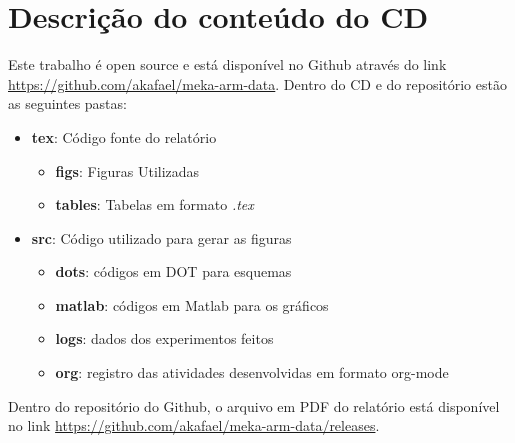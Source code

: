 \chapter{Descrição do conteúdo do CD}

\label{AnCD}

Este trabalho é open source e está disponível no Github através do link \url{https://github.com/akafael/meka-arm-data}. Dentro do CD e do repositório estão as seguintes pastas:

\begin{itemize}
    \item \textbf{tex}: Código fonte do relatório
    \begin{itemize}
        \item \textbf{figs}: Figuras Utilizadas
        \item \textbf{tables}: Tabelas em formato \textit{.tex}
    \end{itemize}
    \item \textbf{src}: Código utilizado para gerar as figuras
    \begin{itemize}
        \item \textbf{dots}: códigos em DOT para esquemas
        \item \textbf{matlab}: códigos em Matlab para os gráficos
        \item \textbf{logs}: dados dos experimentos feitos
        \item \textbf{org}: registro das atividades desenvolvidas em formato org-mode
        \end{itemize}
\end{itemize}

Dentro do repositório do Github, o arquivo em PDF do relatório está disponível no link \url{https://github.com/akafael/meka-arm-data/releases}.

